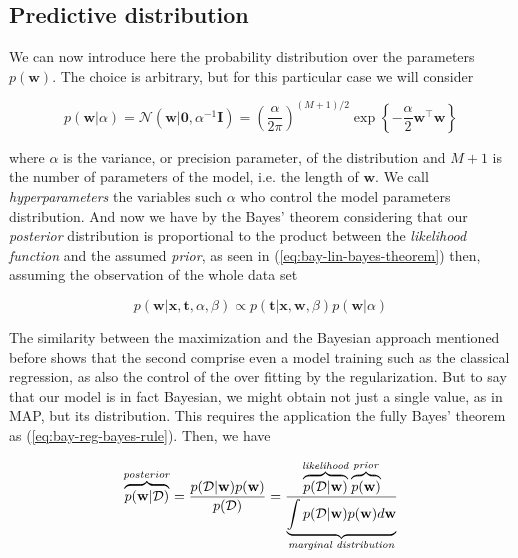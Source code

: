 \documentclass[11pt]{article} %
\begin{document}


\subsection{Predictive distribution}

We can now introduce here the probability distribution over the parameters $p(\mathbf{w})$. The choice is arbitrary, but for this particular case we will consider

\begin{equation}
   \label{eq:bay-lin-reg-prior-dist}
   p(\mathbf{w} | \alpha)=\mathcal{N}\left(\mathbf{w} | \mathbf{0}, \alpha^{-1} \mathbf{I}\right)=\left(\frac{\alpha}{2 \pi}\right)^{(M+1) / 2} \exp \left\{-\frac{\alpha}{2} \mathbf{w}^\top \mathbf{w}\right\}
\end{equation}

where $\alpha$ is the variance, or precision parameter, of the distribution and $M+1$ is the number of parameters of the model, i.e. the length of $\mathbf{w}$. We call \textit{hyperparameters} the variables such $\alpha$ who control the model parameters distribution. And now we have by the Bayes' theorem considering that our \textit{posterior} distribution is proportional to the product between the \textit{likelihood function} and the assumed \textit{prior}, as seen in (\ref{eq:bay-lin-bayes-theorem}) then, assuming the observation of the whole data set

\begin{equation}
   p(\mathbf{w} | \mathbf{x}, \mathbf{t}, \alpha, \beta) \propto p(\mathbf{t} | \mathbf{x}, \mathbf{w}, \beta) p(\mathbf{w} | \alpha)
\end{equation}

The similarity between the maximization and the Bayesian approach mentioned before shows that the second comprise even a model training such as the classical regression, as also the control of the over fitting by the regularization. But to say that our model is in fact Bayesian, we might obtain not just a single value, as in MAP, but its distribution. This requires the application the fully Bayes' theorem as (\ref{eq:bay-reg-bayes-rule}). Then, we have

\begin{equation}
   \overbrace{p(\mathbf{w}|\mathcal{D})}^{posterior} = \frac{p(\mathcal{D}|\mathbf{w}) p(\mathbf{w})}{p(\mathcal{D})} = \frac{\overbrace{p(\mathcal{D}|\mathbf{w})}^{\text{\textit{likelihood}}} \overbrace{p(\mathbf{w})}^{\text{\textit{prior}}}}{\underbrace{\int p(\mathcal{D}|\mathbf{w}) p(\mathbf{w}) d\mathbf{w}}_{\text{\textit{marginal distribution}}}}
\end{equation}
\end{document}
